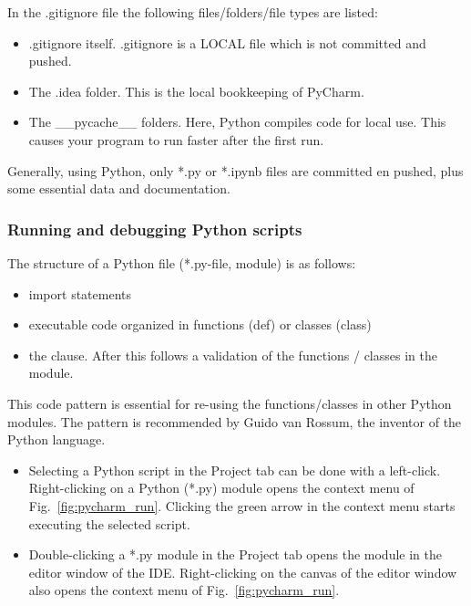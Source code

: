 In the \textsf{.gitignore} file the following files/folders/file types are listed:

\begin{itemize}
	\item \textsf{.gitignore} itself. \textsf{.gitignore} is a LOCAL file which is not committed and pushed.
	\item The \textsf{.idea} folder. This is the local bookkeeping of PyCharm.
	\item The \_\_pycache\_\_ folders. Here, Python compiles code for local use. This causes your program to run faster after the first run.
\end{itemize}

Generally, using Python, only \textsf{*.py} or \textsf{*.ipynb} files are committed en pushed, plus some essential data and documentation.

\subsubsection{Running and debugging Python scripts}

The structure of a Python file (*.py-file, module) is as follows:

\begin{itemize}
	\item \textsf{import} statements
	\item executable code organized in functions (\textsf{def}) or classes (\textsf{class})
	\item the \textsf{} clause. After this follows a validation of the functions / classes in the module.
\end{itemize}

This code pattern is essential for re-using the functions/classes in other Python modules. The pattern is recommended by Guido van Rossum, the inventor of the Python language.



\begin{itemize}
	\item Selecting a Python script in the Project tab can be done with a left-click. Right-clicking on a Python (*.py) module opens the context menu of Fig.~\ref{fig:pycharm_run}. Clicking the green arrow in the context menu starts executing the selected script.
	\item Double-clicking a *.py module in the Project tab opens the module in the editor window of the IDE. Right-clicking on the canvas of the editor window also opens the context menu of Fig.~\ref{fig:pycharm_run}.
\end{itemize}

